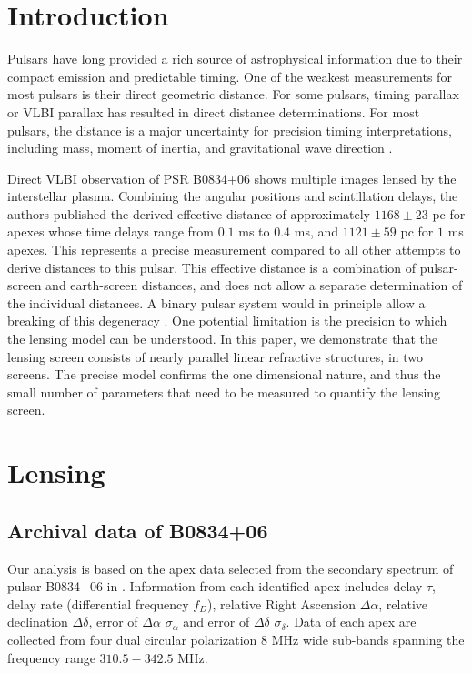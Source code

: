 \documentclass[useAMS,usenatbib]{mn2e}
\begin{document}
\newcommand{\be}{\begin{eqnarray}}
\newcommand{\ee}{\end{eqnarray}}
\newcommand{\beq}{\begin{equation}}
\newcommand{\eeq}{\end{equation}}

\section{Introduction}

Pulsars have long provided a rich source of astrophysical information
due to their compact emission and predictable timing. One of the
weakest measurements for most pulsars is their direct geometric
distance.  For some pulsars, timing parallax or VLBI parallax has
resulted in direct distance determinations.  For most pulsars, the
distance is a major uncertainty for precision timing interpretations,
including mass, moment of inertia, and gravitational wave
direction \citep{boyle2012}.

Direct VLBI observation of PSR B0834+06 shows multiple images lensed
by the interstellar plasma.  Combining the angular positions and
scintillation delays, the authors published the derived effective
distance \citep{2010ApJ...708..232B} of approximately $1168\pm 23$ pc
for apexes whose time delays range from $0.1$ ms to $0.4$ ms, and
$1121\pm 59$ pc for $1$ ms apexes.  This represents a precise
measurement compared to all other attempts to derive distances to this
pulsar.  This effective distance is a combination of pulsar-screen and
earth-screen distances, and does not allow a separate determination of
the individual distances.  A binary pulsar system would in principle
allow a breaking of this degeneracy \citep{2014MNRAS.442.3338P}. One
potential limitation is the precision to which the lensing model can
be understood.  In this paper, we demonstrate that the lensing screen
consists of nearly parallel linear refractive structures, in two
screens.  The precise model confirms the one dimensional nature, and
thus the small number of parameters that need to be measured to
quantify the lensing screen. 

\section{Lensing}
\subsection{Archival data of B0834+06}
\label{21}
Our analysis is based on the apex data selected from the secondary spectrum of pulsar B0834+06 in \citep{2010ApJ...708..232B}. 
Information from each identified apex includes delay $\tau$,
delay rate (differential frequency $f_D$), relative Right Ascension $\Delta\alpha$, relative declination $\Delta\delta$, error of $\Delta\alpha$ $\sigma_{\alpha}$ and error of $\Delta\delta$ $\sigma_{\delta}$. Data of each apex are collected from four dual circular polarization $8$ MHz wide sub-bands spanning the frequency range $310.5-342.5$ MHz. 
\end{document}
